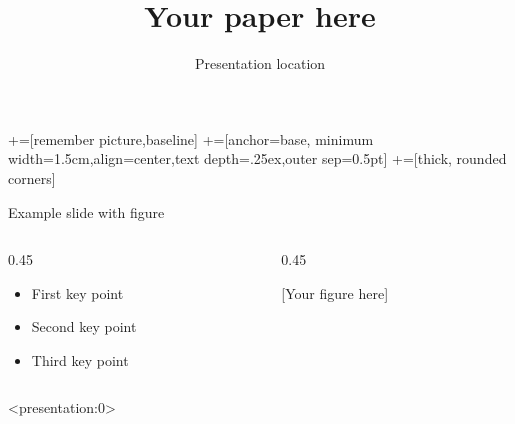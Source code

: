 \documentclass[handout,english,14pt,aspectratio=1610]{beamer}
\title{Your paper here}
\author[Names]{%
  \texorpdfstring{%
    \begin{columns}
      \column{.35\linewidth}
      \centering
      {Name} \\ \textcolor{hl}{Affil}
      \column{.35\linewidth}
      \centering
      {Name} \\ \textcolor{hl}{Affil}
    \end{columns}
 }
 {initials}
}
\date{Presentation location}
\begin{document}
\maketitle

\newcommand\tabnode[1]{\addtocounter{nodecount}{1} \tikz \node  (\arabic{nodecount}) {#1};}
+=[remember picture,baseline]
+=[anchor=base,
minimum width=1.5cm,align=center,text depth=.25ex,outer sep=0.5pt]
+=[thick, rounded corners]

\begin{frame}[c]{Example slide with figure}
    \begin{columns}
        \begin{column}{0.45\textwidth}
           \begin{itemize} \itemsep 1em
               \item[] First key point
               \item[] Second key point
               \item[] Third key point
           \end{itemize}
        \end{column}
        \begin{column}{0.45\textwidth}
            \begin{center}
                [Your figure here]
             \end{center}
        \end{column}
    \end{columns}
\end{frame}


\begin{frame}<presentation:0>
  \begin{singlespace}
    
    {}
    \end{singlespace}
\end{frame}
\end{document}

